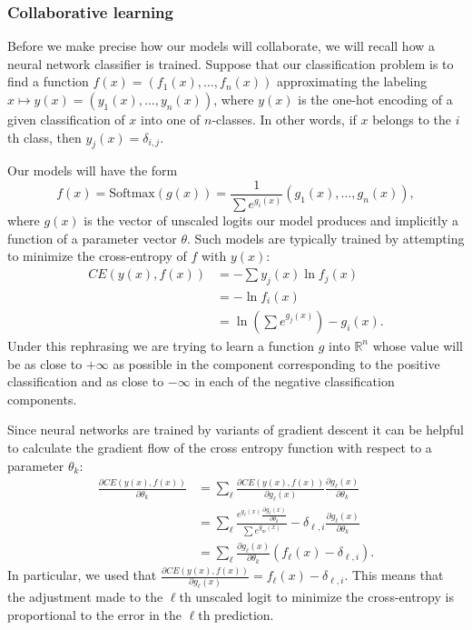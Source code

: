 \documentclass[english,a4paper,oneside]{amsart}
\theoremstyle{definition}
\begin{document}
\subsubsection{Collaborative learning}\label{sec:collab}
Before we make precise how our models will collaborate, we will recall how a neural network classifier is trained. Suppose that our classification problem is to find a function $f(x)=(f_1(x),\dots, f_n(x))$ approximating the labeling $x \mapsto y(x)=(y_1(x),\dots, y_n(x))$, where $y(x)$ is the one-hot encoding of a given classification of $x$ into one of $n$-classes. In other words, if $x$ belongs to the $i$th class, then $y_j(x)=\delta_{i,j}$. 

Our models will have the form \[f(x)=\textrm{Softmax}(g(x))=\frac{1}{\sum e^{g_i(x)}}(g_1(x),\dots, g_n(x)),\] where $g(x)$ is the vector of unscaled logits our model produces and implicitly a function of a parameter vector $\theta$. Such models are typically trained by attempting to minimize the cross-entropy of $f$ with $y(x)$:
\begin{align*}
CE(y(x), f(x)) &= - \sum y_j(x) \ln f_j(x)\\
&=-\ln f_i(x)\\
&=\ln(\sum e^{g_j(x)})-g_i(x).
\end{align*} 
Under this rephrasing we are trying to learn a function $g$ into $\mathbb{R}^n$ whose value will be as close to $+\infty$ as possible in the component corresponding to the positive classification and as close to $-\infty$ in each of the negative classification components. 

Since neural networks are trained by variants of gradient descent it can be helpful to calculate the gradient flow of the cross entropy function with respect to a parameter $\theta_k$:
\begin{align*}
 \frac{\partial CE(y(x), f(x))}{\partial \theta_k} &= \sum_\ell \frac{\partial CE(y(x), f(x))}{\partial g_\ell(x)} \frac{\partial g_\ell(x)}{\partial \theta_k} \\
 &=\sum_\ell \frac{e^{g_\ell(x)} \frac{\partial g_\ell(x)}{\partial \theta_k}}{\sum e^{g_m(x)}}-\delta_{\ell, i} \frac{\partial g_\ell(x)}{\partial \theta_k} \\
 &= \sum_\ell \frac{\partial g_\ell(x)}{\partial \theta_k}(f_\ell(x)-\delta_{\ell, i}).
 \end{align*}
 In particular, we used that $\frac{\partial CE(y(x), f(x))}{\partial g_\ell(x)}=f_\ell(x)-\delta_{\ell, i}.$ This means that the adjustment made to the $\ell$th unscaled logit to minimize the cross-entropy is proportional to the error in the $\ell$th prediction. 
\end{document}
